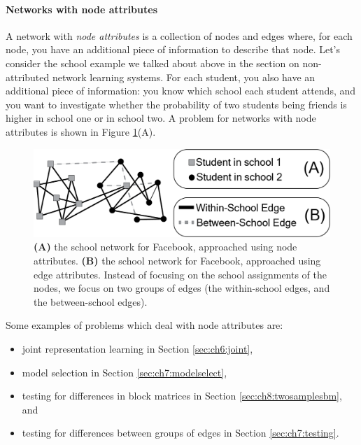 \paragraph{Networks with node attributes}

A network with \textit{node attributes} is a collection of nodes and edges where, for each node, you have an additional piece of information to describe that node. Let’s consider the school example we talked about above in the section on non-attributed network learning systems. For each student, you also have an additional piece of information: you know which school each student attends, and you want to investigate whether the probability of two students being friends is higher in school one or in school two. A problem for networks with node attributes is shown in Figure \ref{fig:ch1:netnode_edge_attr}(A). 

\begin{figure}[h]
\includegraphics[width=\linewidth]{foundations/ch1/Images/nodeedge_attr.png}
\caption[School with node and edge attributes]{\textbf{(A)} the school network for Facebook, approached using node attributes. \textbf{(B)} the school network for Facebook, approached using edge attributes. Instead of focusing on the school assignments of the nodes, we focus on two groups of edges (the within-school edges, and the between-school edges).}
\label{fig:ch1:netnode_edge_attr}
\end{figure}


Some examples of problems which deal with node attributes are:
\begin{itemize}
\item 

joint representation learning in Section \ref{sec:ch6:joint},

\item 

model selection in Section \ref{sec:ch7:modelselect},

\item 

testing for differences in block matrices in Section \ref{sec:ch8:twosamplesbm}, and

\item 

testing for differences between groups of edges in Section \ref{sec:ch7:testing}.

\end{itemize}

